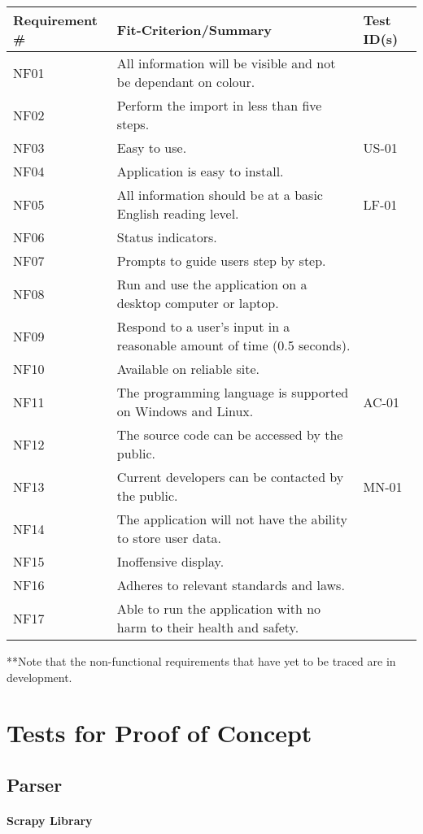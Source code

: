 \documentclass[12pt, titlepage]{article}
\begin{document}
\begin{tabular}{ |p{3cm}|p{8cm}|p{2cm}| }
\hline Requirement \#  & Fit-Criterion/Summary & Test ID(s) \\
\toprule
NF01 & All information will be visible and not be dependant on colour.  & \\
NF02 & Perform the import in less than five steps. & \\
NF03 & Easy to use. & US-01 \\
NF04 & Application is easy to install. & \\
NF05 & All information should be at a basic English reading level.  & LF-01 \\
NF06 & Status indicators. & \\
NF07 & Prompts to guide users step by step. & \\
NF08 & Run and use the application on a desktop computer or laptop.  & \\
NF09 & Respond to a user’s input in a reasonable amount of time (0.5 seconds). & \\
NF10 & Available on reliable site. & \\
NF11 & The programming language is supported on Windows and Linux.  & AC-01\\
NF12 & The source code can be accessed by the public.  & \\
NF13 & Current developers can be contacted by the public.  & MN-01 \\
NF14 & The application will not have the ability to store user data. & \\
NF15 & Inoffensive display. & \\
NF16 & Adheres to relevant standards and laws. & \\
NF17 & Able to run the application with no harm to their health and safety.  & \\

\bottomrule
\end{tabular}
\caption{**Note that the non-functional requirements that have yet to be traced are in development.}
\section{Tests for Proof of Concept}

\subsection{Parser}
		
\paragraph{Scrapy Library}
\end{document}
